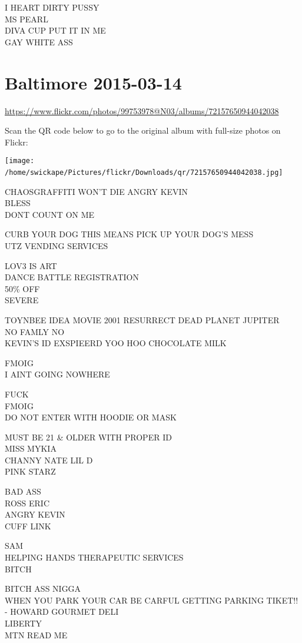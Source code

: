 \documentclass[10pt,letterpaper]{article}
\begin{document}
I HEART DIRTY PUSSY\\
MS PEARL\\
DIVA CUP PUT IT IN ME\\
GAY WHITE ASS
\

\section*{Baltimore 2015-03-14}

\url{https://www.flickr.com/photos/99753978@N03/albums/72157650944042038}

Scan the QR code below to go to the original album with full-size photos on Flickr:

\texttt{[image: /home/swickape/Pictures/flickr/Downloads/qr/72157650944042038.jpg]}
\

CHAOSGRAFFITI WON'T DIE ANGRY KEVIN\\
BLESS\\
DONT COUNT ON ME

CURB YOUR DOG THIS MEANS PICK UP YOUR DOG'S MESS\\
UTZ VENDING SERVICES

LOV3 IS ART\\
DANCE BATTLE REGISTRATION\\
50\% OFF\\
SEVERE

TOYNBEE IDEA MOVIE 2001 RESURRECT DEAD PLANET JUPITER\\
NO FAMLY NO\\
KEVIN'S ID EXSPIEERD YOO HOO CHOCOLATE MILK

FMOIG\\
I AINT GOING NOWHERE

FUCK\\
FMOIG\\
DO NOT ENTER WITH HOODIE OR MASK

MUST BE 21 \& OLDER WITH PROPER ID\\
MISS MYKIA\\
CHANNY NATE LIL D\\
PINK STARZ

BAD ASS\\
ROSS ERIC\\
ANGRY KEVIN\\
CUFF LINK

SAM\\
HELPING HANDS THERAPEUTIC SERVICES\\
BITCH

BITCH ASS NIGGA\\
WHEN YOU PARK YOUR CAR BE CARFUL GETTING PARKING TIKET!! {-} HOWARD GOURMET DELI\\
LIBERTY\\
MTN READ ME
\end{document}
